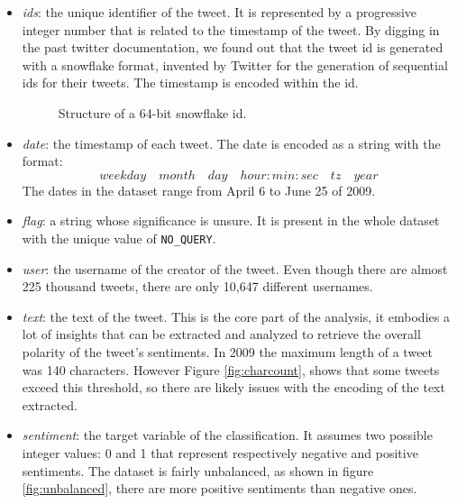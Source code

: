 \documentclass[conference]{IEEEtran}
\begin{document}
\begin{itemize}
    \item \textit{ids}: the unique identifier of the tweet. It is represented by a progressive integer number that is related to the timestamp of the tweet. By digging in the past twitter documentation, we found out that the tweet id is generated with a snowflake format\cite{snowflake}, invented by Twitter for the generation of sequential ids for their tweets. The timestamp is encoded within the id.
    \begin{figure}[h]
        \centering
        
        \caption{Structure of a 64-bit snowflake id.}
        \label{fig:snowflake}
\end{figure}
    \item \textit{date}: the timestamp of each tweet. The date is encoded as a string with the format:
    $$weekday \quad month \quad day \quad hour:min:sec \quad tz \quad year$$
    The dates in the dataset range from April 6 to June 25 of 2009. %
    \item \textit{flag}: a string whose significance is unsure. It is present in the whole dataset with the unique value of \texttt{NO\_QUERY}. %
    \item \textit{user}: the username of the creator of the tweet. Even though there are almost 225 thousand tweets, there are only 10,647 different usernames. %
    \item \textit{text}: the text of the tweet. This is the core part of the analysis, it embodies a lot of insights that can be extracted and analyzed to retrieve the overall polarity of the tweet's sentiments. In 2009 the maximum length of a tweet was 140 characters\cite{tweet_lenght}. However Figure \ref{fig:charcount}, shows that some tweets exceed this threshold, so there are likely issues with the encoding of the text extracted.
    \item \textit{sentiment}: the target variable of the classification. It assumes two possible integer values: 0 and 1 that represent respectively negative and positive sentiments. The dataset is fairly unbalanced, as shown in figure \ref{fig:unbalanced}, there are more positive sentiments than negative ones.
\end{itemize}
\end{document}
